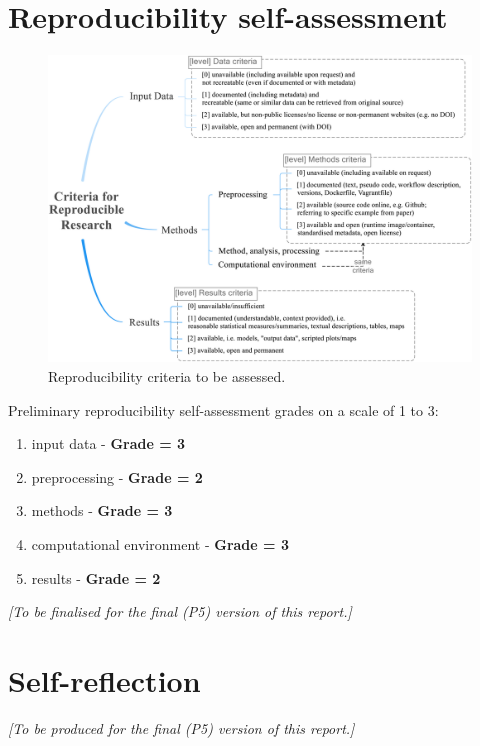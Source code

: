 
\section{Reproducibility self-assessment}
\label{sec:reproducibility}

\begin{figure}[h]
  \centering
  \includegraphics[width=0.9\linewidth]{figs/reproducibility_criteria.png}
  \caption{Reproducibility criteria to be assessed.}
\label{fig:reproducibility_criteria}
\end{figure}


Preliminary reproducibility self-assessment grades on a scale of 1 to 3:

\begin{enumerate}
  \item input data - \textbf{Grade = 3}
  \item preprocessing - \textbf{Grade = 2}
  \item methods - \textbf{Grade = 3}
  \item computational environment - \textbf{Grade = 3}
  \item results - \textbf{Grade = 2}
\end{enumerate}

\textit{[To be finalised for the final (P5) version of this report.]}

\section{Self-reflection} 

\textit{[To be produced for the final (P5) version of this report.]}